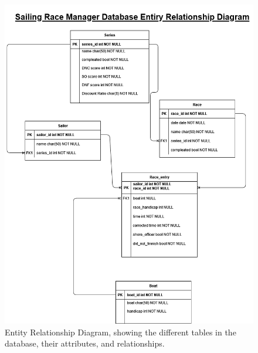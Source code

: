 \documentclass{l4proj}
\begin{document}
\begin{figure}[H]
    \centering
    \includegraphics[width=0.75\linewidth]{images/ERD FINAL.png} 

    \caption{Entity Relationship Diagram, showing the different tables in the database, their attributes, and relationships.
    }

    \label{fig:ERD}
\end{figure}
\end{document}
